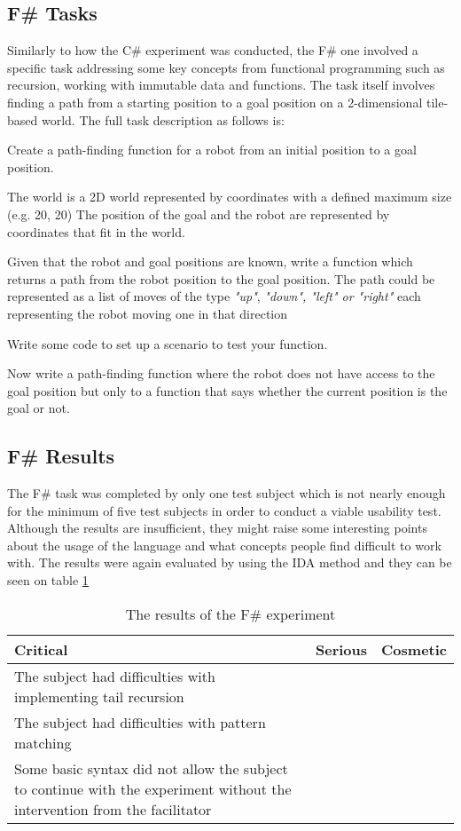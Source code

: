 \subsection{F\# Tasks}
Similarly to how the C\# experiment was conducted, the F\# one involved a specific task addressing some key concepts from functional programming such as recursion, working with immutable data and functions.
The task itself involves finding a path from a starting position to a goal position on a 2-dimensional tile-based world. The full task description as follows is:

Create a path-finding function for a robot from an initial position to a goal position.

The world is a 2D world represented by coordinates with a defined maximum size (e.g. 20, 20)
The position of the goal and the robot are represented by coordinates that fit in the world.

Given that the robot and goal positions are known, write a function which returns a path from the robot position to the goal position.
The path could be represented as a list of moves of the type \textit{"up"}, \textit{"down", "left" or "right"} each representing the robot moving one in that direction

Write some code to set up a scenario to test your function.

Now write a path-finding function where the robot does not have access to the goal position but only to a function that says whether the current position is the goal or not.


\subsection{F\# Results}
The F\# task was completed by only one test subject which is not nearly enough for the minimum of five test subjects in order to conduct a viable usability test. Although the results are insufficient, they might raise some interesting points about the usage of the language and what concepts people find difficult to work with. The results were again evaluated by using the IDA method and they can be seen on table \ref{F-usability-results}

\begin{table} [!h]
\centering
\renewcommand{\arraystretch}{1.5}
\label{F-usability-results}
\begin{tabular}{| p{5cm} | p{5cm} | p{5cm} |}
\hline
Critical & Serious     & Cosmetic \\ \hline
	The subject had difficulties with implementing tail recursion	 &  &  \\ \hline 
The subject had difficulties with pattern matching & &  \\ \hline
Some basic syntax did not allow the subject to continue with the experiment without the intervention from the facilitator & &  \\ \hline
\end{tabular}
\caption{The results of the F\# experiment}
\end{table}

